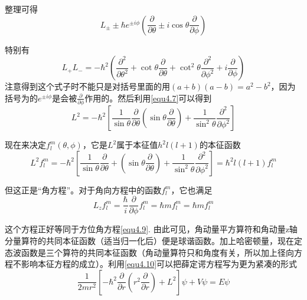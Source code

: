 \documentclass[UTF8]{ctexart}
\begin{document}
\noindent 整理可得
\begin{equation}
    L_{\pm} \pm \hbar e^{\pm i \phi} \left(\frac{\partial}{\partial \theta} \pm i \cos \theta \frac{\partial}{\partial \phi}\right)
\end{equation}

\noindent 特别有 
\begin{equation}
    L_{+} L_{-}=-\hbar^{2}\left(\frac{\partial^{2}}{\partial \theta^{2}}+\cot \theta \frac{\partial}{\partial \theta}+\cot ^{2} \theta \frac{\partial^{2}}{\partial \phi^{2}}+i \frac{\partial}{\partial \phi}\right)
    \end{equation}
\noindent 注意得到这个式子时不能只是对括号里面的用$(a+b)(a-b) = a^2 -b^2$，因为括号为的$e^{\pm i \phi}$是会被$\frac{\partial}{\partial \phi}$作用的。然后利用\autoref{equ4.7}可以得到 
\begin{equation}
    L^2 = - \hbar^2 \left[\frac{1}{\sin \theta} \frac{\partial}{\partial \theta}\left(\sin \theta \frac{\partial}{\partial \theta}\right) + \frac{1}{\sin^2 \theta} \frac{\partial^2}{\partial \phi^2}\right]
\end{equation}

    现在来决定$f_l^m(\theta ,\phi)$，它是$L^2$属于本征值$h^2 l (l+1)$的本征函数 
    \begin{equation}
        L^2 f_l^m = - \hbar^2 \left[\frac{1}{\sin \theta} \frac{\partial}{\partial \theta } +\left(\sin \theta \frac{\partial}{\partial \theta}\right) + \frac{1}{\sin^2 \theta} \frac{\partial^2}{\partial \phi^2}\right] = \hbar^2 l(l+1) f_l^m \label{equ4.10}
    \end{equation}

\noindent 但这正是“角方程”。对于角向方程中的函数$f_l^m$，它也满足
\begin{equation}
    L_z f_l^m = \frac{\hbar}{i} \frac{\partial}{\partial \phi} f_l^m = \hbar m f_l^m = \hbar m f_l^m 
\end{equation}

\noindent 这个方程正好等同于方位角方程\autoref{equ4.9}. 由此可见，角动量平方算符和角动量z轴分量算符的共同本征函数（适当归一化后）便是球谐函数。加上哈密顿量，现在定态波函数是三个算符的共同本征函数（角动量算符只和角度有关，所以加上径向方程不影响本征方程的成立）。利用\autoref{equ4.10}可以把薛定谔方程写为更为紧凑的形式
\begin{equation}
    \frac{1}{2m r^2} \left[- \hbar^2 \frac{\partial}{\partial r} \left(r^2 \frac{\partial}{\partial r}\right) + L^2 \right] \psi + V \psi = E \psi   
\end{equation}
\end{document}
